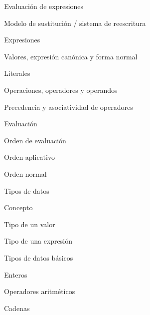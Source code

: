 \begin{longenum}
\begin{longenum}
        \begin{longenum}
            \item Evaluación de expresiones
            \item Modelo de sustitución / sistema de reescritura
        \end{longenum}
        \item Expresiones
        \begin{longenum}
            \item Valores, expresión canónica y forma normal
            \item Literales
            \item Operaciones, operadores y operandos
            \begin{longenum}
                \item Precedencia y asociatividad de operadores
            \end{longenum}
            \item Evaluación
            \begin{longenum}
                \item Orden de evaluación
                \begin{longenum}
                    \item Orden aplicativo
                    \item Orden normal
                \end{longenum}
            \end{longenum}
            \item Tipos de datos
            \begin{longenum}
                \item Concepto
                \begin{longenum}
                    \item Tipo de un valor
                    \item Tipo de una expresión
                \end{longenum}
                \item Tipos de datos básicos
                \begin{longenum}
                    \item Enteros
                    \begin{longenum}
                        \item Operadores aritméticos
                    \end{longenum}
                    \item Cadenas

\end{longenum}
\end{longenum}
\end{longenum}
\end{longenum}
\end{longenum}
